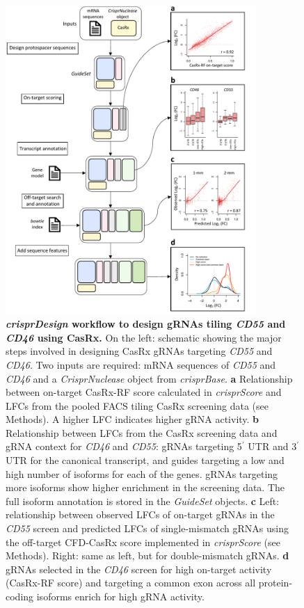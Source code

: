 \documentclass[pdftex,english,10pt]{article}
\begin{document}
\begin{figure}
\centering
\includegraphics[width=0.85\textwidth]{analyses/casrx/sanjana/figures/casrx.pdf}
  \caption{\textbf{\textit{crisprDesign} workflow to design gRNAs tiling \textit{CD55} and \textit{CD46} using CasRx.} 
  On the left: schematic showing the major steps involved in designing CasRx gRNAs targeting \textit{CD55} and \textit{CD46}.
Two inputs are required: mRNA sequences of \textit{CD55} and \textit{CD46} and a 
\textit{CrisprNuclease} object from \textit{crisprBase}. 
\textbf{a} Relationship between on-target CasRx-RF score calculated in \textit{crisprScore} and LFCs from the pooled FACS tiling CasRx screening data (see Methods). A higher LFC indicates higher gRNA activity.
\textbf{b} Relationship between LFCs from the CasRx screening data and gRNA context for \textit{CD46} and \textit{CD55}: gRNAs targeting 5$^\prime$ UTR and 3$^\prime$ UTR for the canonical transcript, and guides targeting a low and high number of isoforms for each of the genes. gRNAs targeting more isoforms show higher enrichment in the screening data. The full isoform annotation is stored in the \textit{GuideSet} objects.
\textbf{c} Left: relationship between observed LFCs of on-target gRNAs in the \textit{CD55} screen and predicted LFCs of single-mismatch gRNAs using the off-target CFD-CasRx score implemented in \textit{crisprScore} (see Methods). Right: same as left, but for double-mismatch gRNAs.
\textbf{d} gRNAs selected in the \textit{CD46} screen for high on-target activity (CasRx-RF score) and targeting a common exon across all protein-coding isoforms enrich for high gRNA activity. }
  \label{fig:casrx}
\end{figure}
\end{document}
